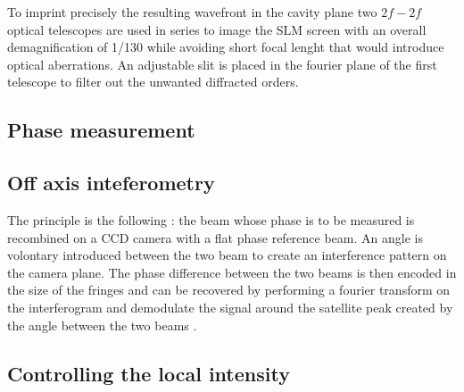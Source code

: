 To imprint precisely the resulting wavefront in the cavity plane two $2f-2f$ optical telescopes are used in series to image the SLM screen with an overall demagnification of 1/130 while avoiding short focal lenght that would introduce optical aberrations.
An adjustable slit is placed in the fourier plane of the first telescope to filter out the unwanted diffracted orders.

\subsection{Phase measurement}
\label{sec:phase_measurement}

\subsection{Off axis inteferometry}
The principle is the following :
the beam whose phase is to be measured is recombined on a CCD camera with a flat phase reference beam. An angle is volontary introduced between the two beam to create an interference pattern on the camera plane. The phase difference between 
the two beams is then encoded in the size of the fringes and can be recovered by performing a fourier transform on the interferogram and demodulate the signal around the satellite peak created by the angle between the two beams \cite{liebling_complex-wave_2004}.

\subsection{Controlling the local intensity}

\label{sec:local_intensity}